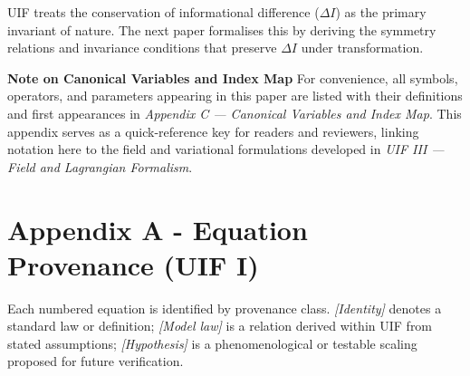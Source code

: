 \noindent
UIF treats the conservation of informational difference ($\Delta I$) as the primary invariant of nature. The next paper formalises this by deriving the symmetry relations and invariance conditions that preserve $\Delta I$ under transformation.
\newline

\noindent \textbf{Note on Canonical Variables and Index Map}
\newline
For convenience, all symbols, operators, and parameters appearing in this paper
are listed with their definitions and first appearances in
\textit{Appendix C — Canonical Variables and Index Map}.
This appendix serves as a quick-reference key for readers and reviewers,
linking notation here to the field and variational formulations developed in
\textit{UIF III — Field and Lagrangian Formalism}.


\clearpage
\appendix
\section*{Appendix A - Equation Provenance (UIF I)}

\noindent
Each numbered equation is identified by provenance class.  
\emph{[Identity]} denotes a standard law or definition;  
\emph{[Model law]} is a relation derived within UIF from stated assumptions;  
\emph{[Hypothesis]} is a phenomenological or testable scaling proposed for future verification.
\vspace{1em}

